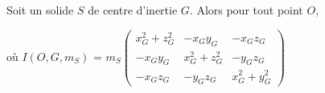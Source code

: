 ﻿\documentclass[a4paper]{article}
\begin{document}
\pagestyle{fancy}
\fancyhf{}
\setlength{\headheight}{15pt}

\begin{center}
	\large{}
\end{center}


Soit un solide $S$ de centre d'inertie $G$. Alors pour tout point $O$,
\begin{center}\end{center}
où \( I(O,G,m_S) \) = \( m_S \begin{pmatrix} x_G^2 + z_G^2 & - x_G y_G & - x_G z_G \\[3pt] - x_G y_G & x_G^2 + z_G^2 & - y_G z_G \\[3pt] - x_G z_G & - y_G z_G & x_G^2 + y_G^2 \end{pmatrix}  \)
\end{document}
